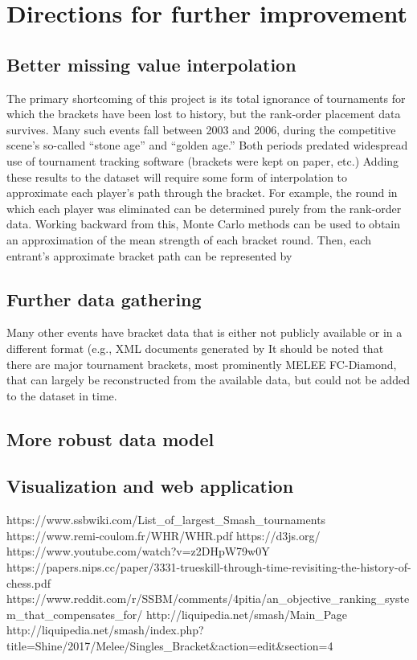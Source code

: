\documentclass[10pt]{article}
\theoremstyle{definition}
\theoremstyle{remark}
\begin{document}
\section{Directions for further improvement}
\subsection{Better missing value interpolation}
The primary shortcoming of this project is its total ignorance of tournaments
for which the brackets have been lost to history, but the rank-order placement
data survives. Many such events fall between 2003 and 2006, during the
competitive scene's so-called ``stone age'' and ``golden age.'' Both periods
predated widespread use of tournament tracking software (brackets were kept on
paper, etc.) Adding these results to the dataset will require some form of
interpolation to approximate each player's path through the bracket. For
example, the round in which each player was eliminated can be determined
purely from the rank-order data. Working backward from this, Monte Carlo
methods can be used to obtain an approximation of the mean strength of each
bracket round. Then, each entrant's approximate bracket path can be
represented by 

\subsection{Further data gathering}
Many other events have bracket data that is either not publicly available or
in a different format (e.g., XML documents generated by 
It should be noted that there are major tournament brackets, most prominently
MELEE FC-Diamond, that can largely be reconstructed from the available data,
but could not be added to the dataset in time.

\subsection{More robust data model}

\subsection{Visualization and web application}

\newpage
\begin{thebibliography}{7}
 https://www.ssbwiki.com/List\_of\_largest\_Smash\_tournaments
 https://www.remi-coulom.fr/WHR/WHR.pdf 
 https://d3js.org/
 https://www.youtube.com/watch?v=z2DHpW79w0Y
 https://papers.nips.cc/paper/3331-trueskill-through-time-revisiting-the-history-of-chess.pdf
 https://www.reddit.com/r/SSBM/comments/4pitia/an\_objective\_ranking\_system\_that\_compensates\_for/
 http://liquipedia.net/smash/Main\_Page
 http://liquipedia.net/smash/index.php?title=Shine/2017/Melee/Singles\_Bracket\&action=edit\&section=4
\end{thebibliography}
\end{document}
